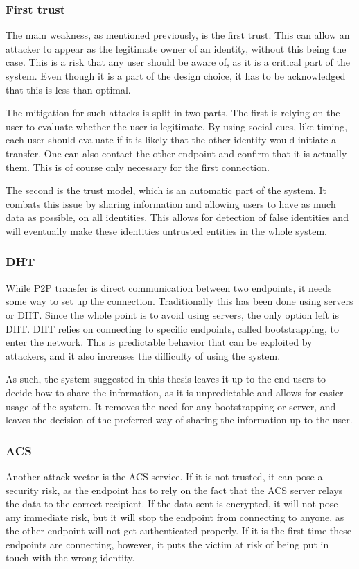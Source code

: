   \subsubsection*{First trust}
  The main weakness, as mentioned previously, is the first trust. This can allow an attacker to appear as the legitimate owner of an identity, without this being the case. This is a risk that any user should be aware of, as it is a critical part of the system. Even though it is a part of the design choice, it has to be acknowledged that this is less than optimal.

  The mitigation for such attacks is split in two parts. The first is relying on the user to evaluate whether the user is legitimate. By using social cues, like timing, each user should evaluate if it is likely that the other identity would initiate a transfer. One can also contact the other endpoint and confirm that it is actually them. This is of course only necessary for the first connection.

  The second is the trust model, which is an automatic part of the system. It combats this issue by sharing information and allowing users to have as much data as possible, on all identities. This allows for detection of false identities and will eventually make these identities untrusted entities in the whole system.
%
  \subsubsection*{DHT}
  While P2P transfer is direct communication between two endpoints, it needs some way to set up the connection. Traditionally this has been done using servers or DHT. Since the whole point is to avoid using servers, the only option left is DHT. DHT relies on connecting to specific endpoints, called bootstrapping, to enter the network. This is predictable behavior that can be exploited by attackers, and it also increases the difficulty of using the system.

  As such, the system suggested in this thesis leaves it up to the end users to decide how to share the information, as it is unpredictable and allows for easier usage of the system. It removes the need for any bootstrapping or server, and leaves the decision of the preferred way of sharing the information up to the user.
  
  \subsubsection*{ACS}
  Another attack vector is the ACS service. If it is not trusted, it can pose a security risk, as the endpoint has to rely on the fact that the ACS server relays the data to the correct recipient. If the data sent is encrypted, it will not pose any immediate risk, but it will stop the endpoint from connecting to anyone, as the other endpoint will not get authenticated properly. If it is the first time these endpoints are connecting, however, it puts the victim at risk of being put in touch with the wrong identity.

